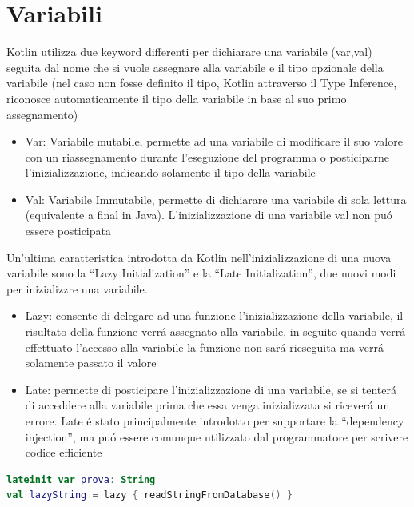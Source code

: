 \section{Variabili}
Kotlin utilizza due keyword differenti per dichiarare una variabile (var,val) seguita dal nome che si vuole assegnare alla variabile e il tipo opzionale della variabile (nel caso non fosse definito il tipo, Kotlin attraverso il Type Inference, riconosce automaticamente il tipo della variabile in base al suo primo assegnamento)

\begin{itemize}                         %
\item Var: Variabile mutabile, permette ad una variabile di modificare il suo valore con un riassegnamento durante l'eseguzione del programma o posticiparne l'inizializzazione, indicando solamente il tipo della variabile
\item Val: Variabile Immutabile, permette di dichiarare una variabile di sola lettura (equivalente a final in Java). L'inizializzazione di una variabile val non pu\'o essere posticipata
\end{itemize}


Un'ultima caratteristica introdotta da Kotlin nell'inizializzazione di una nuova variabile sono la ``Lazy  Initialization'' e la ``Late Initialization'', due nuovi modi per inizializzre una variabile.
\begin{itemize}                         %
\item Lazy: consente di delegare ad una funzione l'inizializzazione della variabile, il risultato della funzione verr\'a assegnato alla variabile, in seguito quando verr\'a effettuato l'accesso alla variabile la funzione non sar\'a rieseguita ma verr\'a solamente passato il valore
\item Late: permette di posticipare l'inizializzazione di una variabile, se si tenter\'a di acceddere alla variabile prima che essa venga inizializzata si ricever\'a un errore. Late \'e  stato principalmente introdotto per supportare la ``dependency injection'', ma pu\'o essere comunque utilizzato dal programmatore per scrivere codice efficiente
\end{itemize}


\begin{lstlisting}[language=Kotlin,caption={Late init}]
lateinit var prova: String
val lazyString = lazy { readStringFromDatabase() }
\end{lstlisting}


